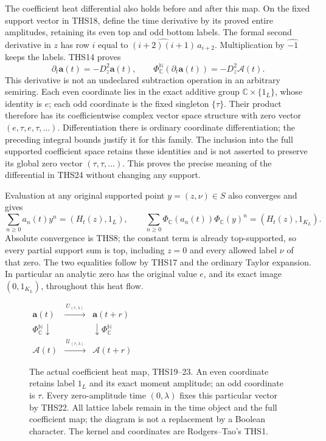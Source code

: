 The coefficient heat differential also holds before and after
this map. On the fixed support vector in THS18, define the time
derivative by its proved entire amplitudes, retaining its even
top and odd bottom labels. The formal second derivative in $z$
has row $i$ equal to $\widehat{(i+2)(i+1)}\,a_{i+2}$.
Multiplication by $\widehat{-1}$ keeps the labels. THS14 proves
\begin{equation}\tag{THS24}
 \partial_t\mathbf a(t)=-D_z^2\mathbf a(t),\qquad
 \Phi_{\mathbb C}^{\mathbb N}(\partial_t\mathbf a(t))
      =-D_z^2\boldsymbol{\mathcal A}(t).
\end{equation}
This derivative is not an undeclared subtraction operation in
an arbitrary semiring. Each even coordinate lies in the exact
additive group $\mathbb C\times\{1_L\}$, whose identity is $e$;
each odd coordinate is the fixed singleton $\{\tau\}$.
Their product therefore has its coefficientwise complex vector
space structure with zero vector $(e,\tau,e,\tau,\ldots)$.
Differentiation there is ordinary coordinate differentiation;
the preceding integral bounds justify it for this family.
The inclusion into the full supported coefficient space retains
these identities and is not asserted to preserve its global
zero vector $(\tau,\tau,\ldots)$. This proves the precise meaning
of the differential in THS24 without changing any support.

Evaluation at any original supported point $y=(z,\nu)\in S$
also converges and gives
\begin{equation}\tag{THS25}
 \sum_{n\ge0}a_n(t)y^n=(H_t(z),1_L),\qquad
 \sum_{n\ge0}\Phi_{\mathbb C}(a_n(t))
                  \Phi_{\mathbb C}(y)^n=(H_t(z),1_{K_L}).
\end{equation}
Absolute convergence is THS8; the constant term is already
top-supported, so every partial support sum is top, including
$z=0$ and every allowed label $\nu$ of that zero. The two
equalities follow by THS17 and the ordinary Taylor expansion.
In particular an analytic zero has the original value $e$,
and its exact image $(0,1_{K_L})$, throughout this heat flow.

\begin{figure}[ht]
\centering
$\begin{array}{ccc}
 \mathbf a(t)&\xrightarrow{\ U_{(r,\lambda)}\ }&\mathbf a(t+r)\\[3pt]
 {\scriptstyle\Phi_{\mathbb C}^{\mathbb N}}\downarrow&&
             \downarrow{\scriptstyle\Phi_{\mathbb C}^{\mathbb N}}\\[3pt]
 \boldsymbol{\mathcal A}(t)&\xrightarrow{\ \mathcal U_{(r,\lambda)}\ }&
                         \boldsymbol{\mathcal A}(t+r)
 \end{array}$
\caption{The actual coefficient heat map, THS19--23. An even
coordinate retains label $1_L$ and its exact moment amplitude;
an odd coordinate is $\tau$. Every zero-amplitude time
$(0,\lambda)$ fixes this particular vector by THS22. All lattice
labels remain in the time object and the full coefficient map;
the diagram is not a replacement by a Boolean character.
The kernel and coordinates are Rodgers--Tao's THS1.}
\end{figure}

